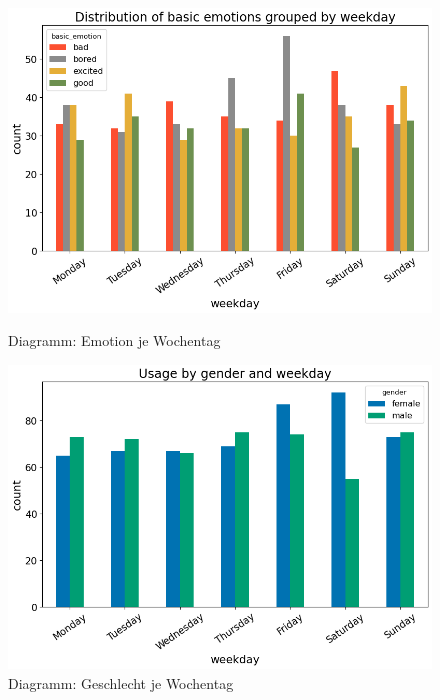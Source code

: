 \begin{figure}[H]
    \centering
    \begin{minipage}[b]{0.49\textwidth}
        \includegraphics[width=\textwidth]{Figures/analysis/emotionwd.png}
        \caption{Diagramm: Emotion je Wochentag}
        \label{fig:emotionwd}
    \end{minipage}
    \hfill
    \begin{minipage}[b]{0.49\textwidth}
        \includegraphics[width=\textwidth]{Figures/analysis/genderwd.png}
        \caption{Diagramm: Geschlecht je Wochentag}
        \label{fig:genderwd}
    \end{minipage}
\end{figure}

